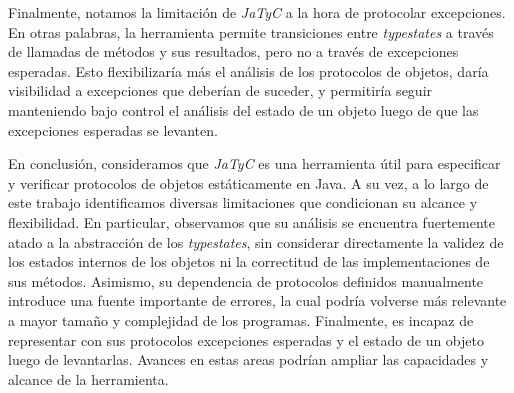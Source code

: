 Finalmente, notamos la limitación de \textit{JaTyC} a la hora de protocolar excepciones. En otras palabras, la herramienta permite transiciones entre \textit{typestates} a través de llamadas de métodos y sus resultados, pero no a través de excepciones esperadas. Esto flexibilizaría más el análisis de los protocolos de objetos, daría visibilidad a excepciones que deberían de suceder, y permitiría seguir manteniendo bajo control el análisis del estado de un objeto luego de que las excepciones esperadas se levanten.

En conclusión, consideramos que \textit{JaTyC} es una herramienta útil para especificar y verificar protocolos de objetos estáticamente en Java. A su vez, a lo largo de este trabajo identificamos diversas limitaciones que condicionan su alcance y flexibilidad. En particular, observamos que su análisis se encuentra fuertemente atado a la abstracción de los \textit{typestates}, sin considerar directamente la validez de los estados internos de los objetos ni la correctitud de las implementaciones de sus métodos. Asimismo, su dependencia de protocolos definidos manualmente introduce una fuente importante de errores, la cual podría volverse más relevante a mayor tamaño y complejidad de los programas. Finalmente, es incapaz de representar con sus protocolos excepciones esperadas y el estado de un objeto luego de levantarlas. Avances en estas areas podrían ampliar las capacidades y alcance de la herramienta.